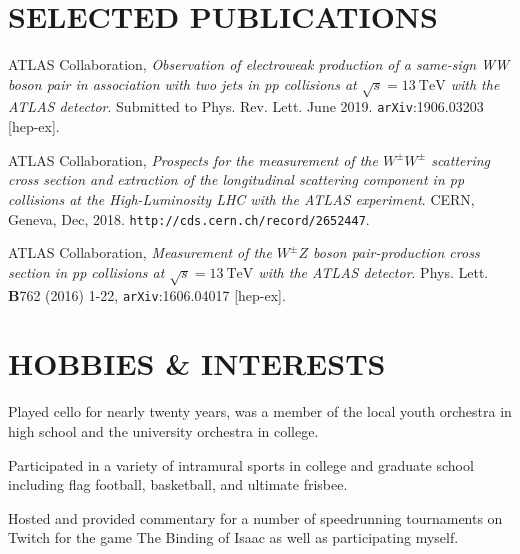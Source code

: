 \documentclass{res}
\begin{document}
\begin{resume}
\section{SELECTED PUBLICATIONS}
    ATLAS Collaboration, {\it Observation of electroweak production of a same-sign WW boson pair in association with two jets in pp collisions at $\sqrt{s}=13~\textrm{TeV}$ with the ATLAS detector}. Submitted to Phys. Rev. Lett. June 2019. {\tt arXiv}:1906.03203 [hep-ex].

    ATLAS Collaboration, {\it Prospects for the measurement of the $W^{\pm}W^{\pm}$ scattering cross section and extraction of the longitudinal scattering component in pp collisions at the High-Luminosity LHC with the ATLAS experiment}. CERN, Geneva, Dec, 2018. {\tt http://cds.cern.ch/record/2652447}. %

    ATLAS Collaboration, {\it Measurement of the $W^{\pm}Z$ boson pair-production cross section in pp collisions at $\sqrt{s}=13~\textrm{TeV}$ with the ATLAS detector}. Phys. Lett. {\bf B}762 (2016) 1-22, {\tt arXiv}:1606.04017 [hep-ex].

\section{HOBBIES \& INTERESTS}
   Played cello for nearly twenty years, was a member of the local youth orchestra in high school and the university orchestra in college.

   Participated in a variety of intramural sports in college and graduate school including flag football, basketball, and ultimate frisbee.

   Hosted and provided commentary for a number of speedrunning tournaments on Twitch for the game The Binding of Isaac as well as participating myself.
 
 
 
\end{resume}
\end{document}
